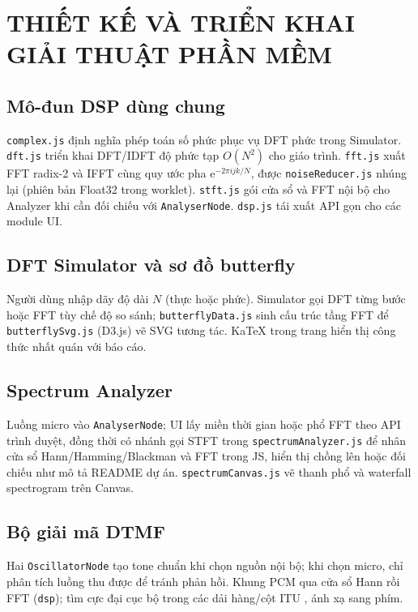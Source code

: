 \pagestyle{fancy}
\chapter{THIẾT KẾ VÀ TRIỂN KHAI GIẢI THUẬT PHẦN MỀM}

\section{Mô-đun DSP dùng chung}
\texttt{complex.js} định nghĩa phép toán số phức phục vụ DFT phức trong Simulator. \texttt{dft.js} triển khai DFT/IDFT độ phức tạp $O(N^2)$ cho giáo trình. \texttt{fft.js} xuất FFT radix-2 và IFFT cùng quy ước pha $\mathrm{e}^{-2\pi ijk/N}$, được \verb|noiseReducer.js| nhúng lại (phiên bản Float32 trong worklet). \texttt{stft.js} gói cửa sổ và FFT nội bộ cho Analyzer khi cần đối chiếu với \texttt{AnalyserNode}. \texttt{dsp.js} tái xuất API gọn cho các module UI.

\section{DFT Simulator và sơ đồ butterfly}
Người dùng nhập dãy độ dài $N$ (thực hoặc phức). Simulator gọi DFT từng bước hoặc FFT tùy chế độ so sánh; \texttt{butterflyData.js} sinh cấu trúc tầng FFT để \texttt{butterflySvg.js} (D3.js) vẽ SVG tương tác. KaTeX trong trang hiển thị công thức nhất quán với báo cáo.

\section{Spectrum Analyzer}
Luồng micro vào \texttt{AnalyserNode}; UI lấy miền thời gian hoặc phổ FFT theo API trình duyệt, đồng thời có nhánh gọi STFT trong \texttt{spectrumAnalyzer.js} để nhân cửa sổ Hann/Hamming/Blackman và FFT trong JS, hiển thị chồng lên hoặc đối chiếu như mô tả README dự án. \texttt{spectrumCanvas.js} vẽ thanh phổ và waterfall spectrogram trên Canvas.

\section{Bộ giải mã DTMF}
Hai \texttt{OscillatorNode} tạo tone chuẩn khi chọn nguồn nội bộ; khi chọn micro, chỉ phân tích luồng thu được để tránh phản hồi. Khung PCM qua cửa sổ Hann rồi FFT (\texttt{dsp}); tìm cực đại cục bộ trong các dải hàng/cột ITU \cite{ituQ23}, ánh xạ sang phím.

